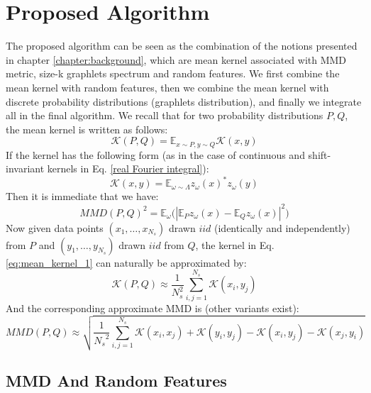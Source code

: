 \section{Proposed Algorithm}
The proposed algorithm can be seen as the combination of the notions presented in chapter \ref{chapter:background}, which are mean kernel associated with MMD metric, size-k graphlets spectrum and random features. We first combine the mean kernel with random features, then we combine the mean kernel with discrete probability distributions (graphlets distribution), and finally we integrate all in the final algorithm.\newline
We recall that for two probability distributions $P,Q$, the mean kernel is written as follows:
\begin{equation}
\label{eq:mean_kernel_1}
\mathcal{K}(P,Q) = \mathbb{E}_{x \sim P, y \sim Q} \mathcal{K}(x,y)
\end{equation}
If the kernel has the following form (as in the case of continuous and shift-invariant kernels in Eq. \ref{real Fourier integral}):
\begin{equation}\label{eq:RF}
\mathcal{K}(x,y) = \mathbb{E}_{\omega \sim \Lambda} z_\omega(x)^* z_\omega(y)
\end{equation}
Then it is immediate that we have:
\begin{equation}
\label{eq:MMD-RF}
MMD(P,Q)^2 = \mathbb{E}_{\omega} \Big( | \mathbb{E}_P z_\omega(x) - \mathbb{E}_Q z_\omega(x) |^2 \Big)
\end{equation}
Now given data points $(x_1, \ldots, x_{N_s})$ drawn $iid$ (identically and independently) from $P$ and $(y_1, \ldots, y_{N_s})$ drawn $iid$ from $Q$, the kernel in Eq. \ref{eq:mean_kernel_1} can naturally be approximated by:
\begin{equation}\label{eq:mean_kernel_approx}
\mathcal{K}(P,Q) \approx \frac{1}{N_s^2} \sum_{i,j=1}^{N_s} \mathcal{K}(x_i,y_j)
\end{equation}
And the corresponding approximate MMD is (other variants exist):
\[
MMD(P,Q) \approx \sqrt{\frac{1}{{N_s}^2} \sum_{i,j=1}^{N_s} \mathcal{K}(x_i,x_j) + \mathcal{K}(y_i,y_j) - \mathcal{K}(x_i,y_j) - \mathcal{K}(x_j, y_i)}
\]

\subsection{MMD And Random Features}

